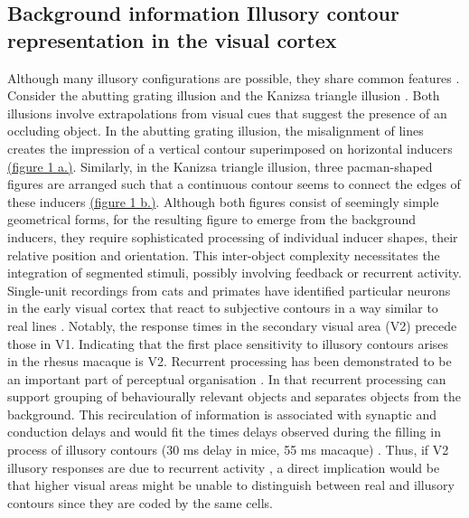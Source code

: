 \documentclass[12pt]{article}
\begin{document}
\subsection{Background information Illusory contour representation in the visual cortex}
Although many illusory configurations are possible, they share common features \autocite{palmerLateInfluencesPerceptual2000}. Consider the abutting grating illusion \autocite{sorianoAbuttingGratingIllusion1996} and the Kanizsa triangle illusion \autocite{kanizsaSubjectiveContours1976}. Both illusions involve extrapolations from visual cues that suggest the presence of an occluding object. In the abutting grating illusion, the misalignment of lines creates the impression of a vertical contour superimposed on horizontal inducers \hyperref[fig:figure_1]{(figure 1 a.)}. Similarly, in the Kanizsa triangle illusion, three pacman-shaped figures are arranged such that a continuous contour seems to connect the edges of these inducers \hyperref[fig:figure_1]{(figure 1 b.)}. Although both figures consist of seemingly simple geometrical forms, for the resulting figure to emerge from the background inducers, they require sophisticated processing of individual inducer shapes, their relative position and orientation. This inter-object complexity necessitates the integration of segmented stimuli, possibly involving feedback or recurrent activity. Single-unit recordings from cats and primates have identified particular neurons in the early visual cortex that react to subjective contours in a way similar to real lines \autocite{leeDynamicsSubjectiveContour2001,vonderheydtMechanismsContourPerception1989}. Notably, the response times in the secondary visual area (V2) precede those in V1. Indicating that the first place sensitivity to illusory contours arises in the rhesus macaque is V2. Recurrent processing has been demonstrated to be an important part of perceptual organisation \autocite{roelfsemaCORTICALALGORITHMSPERCEPTUAL2006}. In that recurrent processing can support grouping of behaviourally relevant objects and separates objects from the background. This recirculation of information is associated with synaptic and conduction delays and would fit the times delays observed during the filling in process of illusory contours (30 ms delay in mice, 55 ms macaque) \autocite{leeDynamicsSubjectiveContour2001,pakTopDownFeedbackControls2020}. Thus, if V2 illusory responses are due to recurrent activity \autocite{leeDynamicsSubjectiveContour2001}, a direct implication would be that higher
visual areas might be unable to distinguish between real and illusory contours since they are coded by the same cells.
\end{document}
